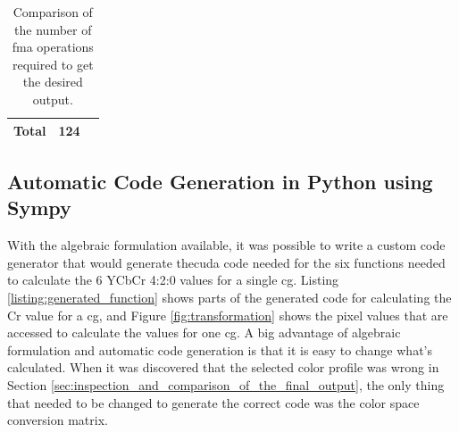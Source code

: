 \begin{table}
\begin{minipage}[b]{.5\linewidth}
{\begin{tabular}{|l|c| c|}
                \textbf{Total}                             & 124                                            \\
                \hline
            \end{tabular}}
    \end{minipage}
    \begin{minipage}[b]{.5\linewidth}
    \end{minipage}
    \caption{Comparison of the number of \gls{fma} operations required to get the desired output.}
    \label{table:debayer_coefficients}
\end{table}

\subsection{Automatic Code Generation in Python using Sympy}
\label{sec:code_generation}
With the algebraic formulation available, it was possible to write a custom code generator that would generate the\gls{cuda} code needed for the six functions needed to calculate the 6 YCbCr 4:2:0 values for a single \gls{cg}.
Listing \ref{listing:generated_function} shows parts of the generated code for calculating the Cr value for a \gls{cg}, and Figure \ref{fig:transformation} shows the pixel values that are accessed to calculate the values for one \gls{cg}.
A big advantage of algebraic formulation and automatic code generation is that it is easy to change what's calculated.
When it was discovered that the selected color profile was wrong in Section \ref{sec:inspection_and_comparison_of_the_final_output}, the only thing that needed to be changed to generate the correct code was the color space conversion matrix.

